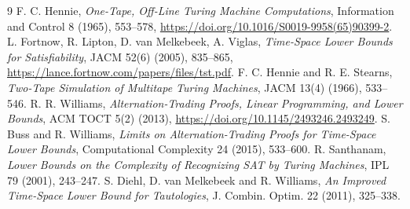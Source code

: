 \documentclass[11pt]{article}
\begin{document}
\begin{thebibliography}{9}
 F. C. Hennie, \emph{One-Tape, Off-Line Turing Machine Computations}, Information and Control 8 (1965), 553--578, \url{https://doi.org/10.1016/S0019-9958(65)90399-2}.
 L. Fortnow, R. Lipton, D. van Melkebeek, A. Viglas, \emph{Time-Space Lower Bounds for Satisfiability}, JACM 52(6) (2005), 835--865, \url{https://lance.fortnow.com/papers/files/tst.pdf}.
 F. C. Hennie and R. E. Stearns, \emph{Two-Tape Simulation of Multitape Turing Machines}, JACM 13(4) (1966), 533--546.
 R. R. Williams, \emph{Alternation-Trading Proofs, Linear Programming, and Lower Bounds}, ACM TOCT 5(2) (2013), \url{https://doi.org/10.1145/2493246.2493249}.
 S. Buss and R. Williams, \emph{Limits on Alternation-Trading Proofs for Time-Space Lower Bounds}, Computational Complexity 24 (2015), 533--600.
 R. Santhanam, \emph{Lower Bounds on the Complexity of Recognizing SAT by Turing Machines}, IPL 79 (2001), 243--247.
 S. Diehl, D. van Melkebeek and R. Williams, \emph{An Improved Time-Space Lower Bound for Tautologies}, J. Combin. Optim. 22 (2011), 325--338.
\end{thebibliography}
\end{document}
